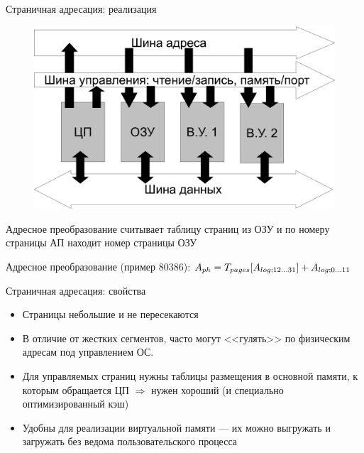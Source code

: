 \documentclass[xetex,aspectratio=43]{beamer}
\begin{document}
\begin{frame}{Страничная адресация: реализация}
    \begin{figure}
        \includegraphics[page=5,height=0.55\textheight]{img/06.Mem_Models-crop.pdf}
    \end{figure}

    Адресное преобразование считывает таблицу страниц из ОЗУ и по номеру
    страницы АП находит номер страницы ОЗУ

    Адресное преобразование (пример 80386):
    \(A_{ph} = T_{pages}[A_{log\\; 12\ldots 31}] + A_{log\\; 0\ldots 11}\)
\end{frame}



\begin{frame}{Страничная адресация: свойства}
    \begin{itemize}
        \item
        Страницы небольшие и не пересекаются
        \item
        В отличие от жестких сегментов, часто могут <<гулять>> по физическим
        адресам под управлением ОС.
        \item
        Для управляемых страниц нужны таблицы размещения в основной памяти, к
        которым обращается ЦП \(\Rightarrow\) нужен хороший (и
        специально оптимизированный кэш)
        \item
        Удобны для реализации виртуальной памяти --- их можно выгружать и
        загружать без ведома пользовательского процесса
    \end{itemize}
\end{frame}
\end{document}
